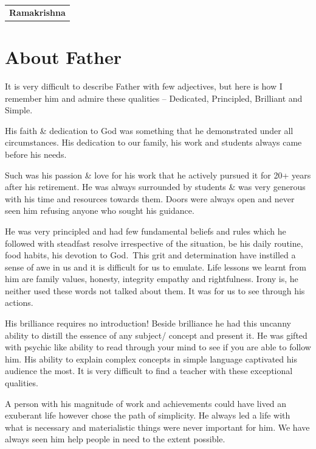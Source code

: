 \begin{flushright}
\begin{tabular}{c}
\textbf{Ramakrishna}
\end{tabular}
\end{flushright}
\bigskip

\section*{About Father}

It is very difficult to describe Father with few adjectives, but here is how I remember him and admire these qualities -- Dedicated, Principled, Brilliant and Simple.

His faith \& dedication to God was something that he demonstrated under all circumstances. His dedication to our family, his work and students always came before his needs.

Such was his passion \& love for his work that he actively pursued it for 20+ years after his retirement. He was always surrounded by students \& was very generous with his time and resources towards them. Doors were always open and never seen him refusing anyone who sought his guidance.

He was very principled and had few fundamental beliefs and rules which he followed with steadfast resolve irrespective of the situation, be his daily routine, food habits, his devotion to God. This grit and determination have instilled a sense of awe in us and it is difficult for us to emulate. Life lessons we learnt from him are family values, honesty, integrity empathy and rightfulness. Irony is, he neither used these words not talked about them. It was for us to see through his actions.  

His brilliance requires no introduction! Beside brilliance he had this uncanny ability to distill the essence of any subject/ concept and present it. He was gifted with psychic like ability to read through your mind to see if you are able to follow him. His ability to explain complex concepts in simple language captivated his audience the most. It is very difficult to find a teacher with these exceptional qualities. 

A person with his magnitude of work and achievements could have lived an exuberant life however chose the path of simplicity. He always led a life with what is necessary and materialistic things were never important for him. We have always seen him help people in need to the extent possible. 

